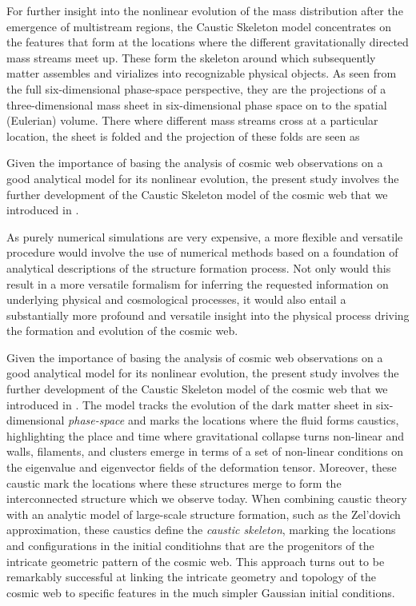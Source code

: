 \documentclass[a4paper, 11pt]{article}
\begin{document}
For further insight into the nonlinear evolution of the mass
distribution after the emergence of multistream regions, the Caustic
Skeleton
model concentrates on the features that form at the locations where the
different gravitationally directed mass streams meet up. These
form the skeleton around which subsequently matter assembles and
virializes into recognizable physical objects. As seen from the full
six-dimensional phase-space perspective, they are the projections of a
three-dimensional mass sheet in six-dimensional phase space on
to the spatial (Eulerian) volume. There where different mass streams
cross at a particular location, the sheet is folded and the projection
of these folds are seen as



Given the importance of basing the analysis of cosmic web observations
on a good analytical model for its nonlinear evolution, the present
study involves the further development of the Caustic Skeleton model of
the cosmic web that we introduced in \citep{Feldbrugge:2018}.



As purely numerical simulations are very expensive,
a more flexible and versatile procedure would involve the use of
numerical methods based on a foundation of analytical descriptions of
the structure formation process. Not only would this result in a more
versatile formalism for inferring the requested information on
underlying physical and cosmological processes, it would also entail a
substantially more profound and versatile insight into the physical
process driving the formation and evolution of the cosmic web.

\medskip
Given the importance of basing the analysis of cosmic web observations
on a good analytical model for its nonlinear evolution, the present
study involves the further development of the Caustic Skeleton model of
the cosmic web that we introduced in \citep{Feldbrugge:2018}. The model
tracks the evolution of the dark matter sheet in six-dimensional
\textit{phase-space} and marks the locations where the fluid forms
caustics, highlighting the place and time where gravitational collapse
turns non-linear and walls, filaments, and clusters emerge in terms of a
set of non-linear conditions on the eigenvalue and eigenvector fields of
the deformation tensor. Moreover, these caustic mark the locations where
these structures merge to form the interconnected structure which we
observe today. When combining caustic theory with an analytic model of
large-scale structure formation, such as the Zel'dovich approximation,
these caustics define the \textit{caustic skeleton}, marking the
locations and configurations in the initial conditiohns that are the
progenitors of the intricate geometric pattern of the cosmic web. This
approach turns out to be remarkably successful at linking the intricate
geometry and topology of the cosmic web to specific features in the much
simpler Gaussian initial conditions.
\end{document}

